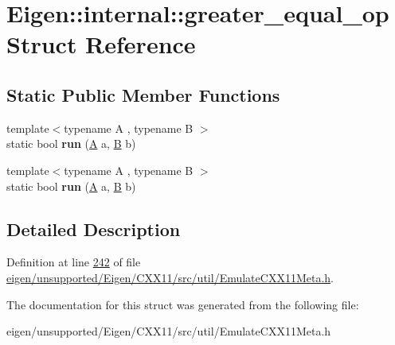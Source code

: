 \hypertarget{struct_eigen_1_1internal_1_1greater__equal__op}{}\section{Eigen\+:\+:internal\+:\+:greater\+\_\+equal\+\_\+op Struct Reference}
\label{struct_eigen_1_1internal_1_1greater__equal__op}
\subsection*{Static Public Member Functions}
\begin{DoxyCompactItemize}
\item 
\mbox{\label{struct_eigen_1_1internal_1_1greater__equal__op_aa13523433bbbc865e4ad40b42c8a8698}} 
{\footnotesize template$<$typename A , typename B $>$ }\\static bool {\bfseries run} (\hyperlink{group___core___module_class_eigen_1_1_matrix}{A} a, \hyperlink{group___core___module_class_eigen_1_1_matrix}{B} b)
\item 
\mbox{\label{struct_eigen_1_1internal_1_1greater__equal__op_aa13523433bbbc865e4ad40b42c8a8698}} 
{\footnotesize template$<$typename A , typename B $>$ }\\static bool {\bfseries run} (\hyperlink{group___core___module_class_eigen_1_1_matrix}{A} a, \hyperlink{group___core___module_class_eigen_1_1_matrix}{B} b)
\end{DoxyCompactItemize}


\subsection{Detailed Description}


Definition at line \hyperlink{eigen_2unsupported_2_eigen_2_c_x_x11_2src_2util_2_emulate_c_x_x11_meta_8h_source_l00242}{242} of file \hyperlink{eigen_2unsupported_2_eigen_2_c_x_x11_2src_2util_2_emulate_c_x_x11_meta_8h_source}{eigen/unsupported/\+Eigen/\+C\+X\+X11/src/util/\+Emulate\+C\+X\+X11\+Meta.\+h}.



The documentation for this struct was generated from the following file\+:\begin{DoxyCompactItemize}
\item 
eigen/unsupported/\+Eigen/\+C\+X\+X11/src/util/\+Emulate\+C\+X\+X11\+Meta.\+h\end{DoxyCompactItemize}
